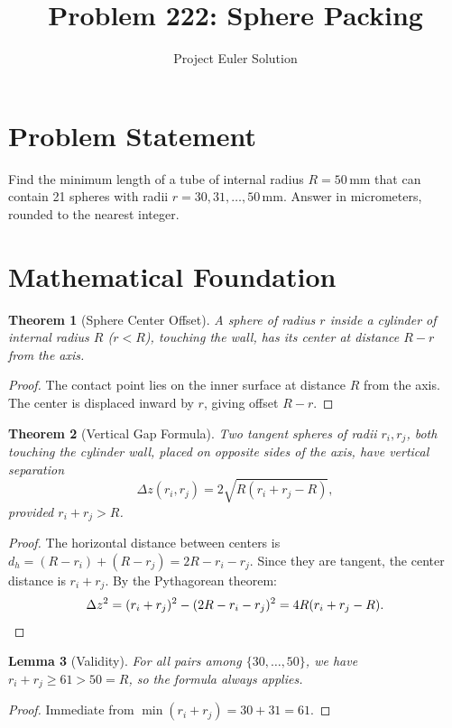 \documentclass[12pt]{article}
\title{Problem 222: Sphere Packing}
\author{Project Euler Solution}
\date{}
\newtheorem{theorem}{Theorem}
\newtheorem{lemma}[theorem]{Lemma}
\begin{document}
\maketitle

\section{Problem Statement}
Find the minimum length of a tube of internal radius $R = 50$\,mm that can contain 21 spheres with radii $r = 30, 31, \ldots, 50$\,mm. Answer in micrometers, rounded to the nearest integer.

\section{Mathematical Foundation}

\begin{theorem}[Sphere Center Offset]
A sphere of radius $r$ inside a cylinder of internal radius $R$ ($r < R$), touching the wall, has its center at distance $R - r$ from the axis.
\end{theorem}
\begin{proof}
The contact point lies on the inner surface at distance $R$ from the axis. The center is displaced inward by $r$, giving offset $R - r$.
\end{proof}

\begin{theorem}[Vertical Gap Formula]
Two tangent spheres of radii $r_i, r_j$, both touching the cylinder wall, placed on opposite sides of the axis, have vertical separation
\[
\Delta z(r_i, r_j) = 2\sqrt{R(r_i + r_j - R)},
\]
provided $r_i + r_j > R$.
\end{theorem}
\begin{proof}
The horizontal distance between centers is $d_h = (R - r_i) + (R - r_j) = 2R - r_i - r_j$. Since they are tangent, the center distance is $r_i + r_j$. By the Pythagorean theorem:
\[
\Delta z^2 = (r_i + r_j)^2 - (2R - r_i - r_j)^2 = 4R(r_i + r_j - R). \qedhere
\]
\end{proof}

\begin{lemma}[Validity]
For all pairs among $\{30, \ldots, 50\}$, we have $r_i + r_j \geq 61 > 50 = R$, so the formula always applies.
\end{lemma}
\begin{proof}
Immediate from $\min(r_i + r_j) = 30 + 31 = 61$.
\end{proof}
\end{document}
